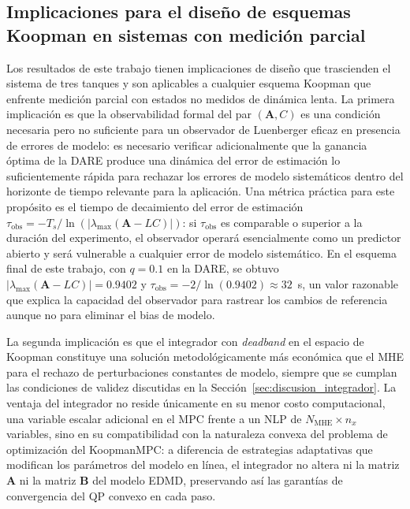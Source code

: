 \documentclass[12pt,letterpaper]{article}
\begin{document}
\subsection{Implicaciones para el diseño de esquemas Koopman 
en sistemas con medición parcial}
\label{sec:discusion_implicaciones}

Los resultados de este trabajo tienen implicaciones de diseño que 
trascienden el sistema de tres tanques y son aplicables a cualquier 
esquema Koopman que enfrente medición parcial con estados no 
medidos de dinámica lenta. La primera implicación es que la 
observabilidad formal del par $(\mathbf{A}, C)$ es una condición 
necesaria pero no suficiente para un observador de Luenberger 
eficaz en presencia de errores de modelo: es necesario verificar 
adicionalmente que la ganancia óptima de la DARE produce una 
dinámica del error de estimación lo suficientemente rápida para 
rechazar los errores de modelo sistemáticos dentro del horizonte 
de tiempo relevante para la aplicación. Una métrica práctica para 
este propósito es el tiempo de decaimiento del error de estimación 
$\tau_{\mathrm{obs}} = -T_s / \ln(|\lambda_{\max}(\mathbf{A} - 
LC)|)$: si $\tau_{\mathrm{obs}}$ es comparable o superior a la 
duración del experimento, el observador operará esencialmente como 
un predictor abierto y será vulnerable a cualquier error de modelo 
sistemático. En el esquema final de este trabajo, con $q = 0.1$ 
en la DARE, se obtuvo $|\lambda_{\max}(\mathbf{A} - LC)| = 0.9402$ 
y $\tau_{\mathrm{obs}} = -2/\ln(0.9402) \approx 32$~s, un valor 
razonable que explica la capacidad del observador para rastrear 
los cambios de referencia aunque no para eliminar el bias de 
modelo.

La segunda implicación es que el integrador con \textit{deadband} 
en el espacio de Koopman constituye una solución metodológicamente 
más económica que el MHE para el rechazo de perturbaciones 
constantes de modelo, siempre que se cumplan las condiciones de 
validez discutidas en la Sección~\ref{sec:discusion_integrador}. 
La ventaja del integrador no reside únicamente en su menor costo 
computacional, una variable escalar adicional en el MPC frente
a un NLP de $N_{\mathrm{MHE}} \times n_x$ variables, sino en
su compatibilidad con la naturaleza convexa del problema de 
optimización del KoopmanMPC: a diferencia de estrategias 
adaptativas que modifican los parámetros del modelo en línea, el 
integrador no altera ni la matriz $\mathbf{A}$ ni la matriz 
$\mathbf{B}$ del modelo EDMD, preservando así las garantías de 
convergencia del QP convexo en cada paso.
\end{document}

